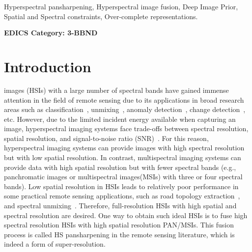 \documentclass[journal]{IEEEtran}
\begin{document}
\begin{IEEEkeywords}
    Hyperspectral pansharpening, Hyperspectral image fusion, Deep Image Prior, Spatial and Spectral constraints, Over-complete representations.
\end{IEEEkeywords}

\ifCLASSOPTIONpeerreview
 \begin{center} \bfseries EDICS Category: 3-BBND \end{center}
\fi
\IEEEpeerreviewmaketitle

\section{Introduction}
 images (HSIs) with a large number of spectral bands have gained immense attention in the field of remote sensing due to its applications in broad research areas such as classification~\cite{hyperspctral_classification}, unmixing~\cite{hyper_unmixing}, anomaly detection~\cite{hyper_anomaly}, change detection~\cite{hyper_change_detection}, etc. However, due to the limited incident energy available when capturing an image, hyperspectral imaging systems face trade-offs between spectral resolution, spatial resolution, and signal-to-noise ratio (SNR)~\cite{hyperspectral_pan_review}. For this reason, hyperspectral imaging systems can provide images with high spectral resolution but with low spatial resolution. In contrast, multispectral imaging systems can provide data with high spatial resolution but with fewer spectral bands (e.g., panchromatic images or multispectral images(MSIs) with three or four spectral bands). Low spatial resolution in HSIs leads to relatively poor performance in some practical remote sensing applications, such as road topology extraction~\cite{road_from_panHSI}, and spectral unmixing~\cite{spectral_unmixing_pan}. Therefore, full-resolution HSIs with high spatial and spectral resolution are desired. One way to obtain such ideal HSIs is to fuse high spectral resolution HSIs with high spatial resolution PAN/MSIs. This fusion process is called HS pansharpening in the remote sensing literature, which is indeed a form of super-resolution.
\end{document}
